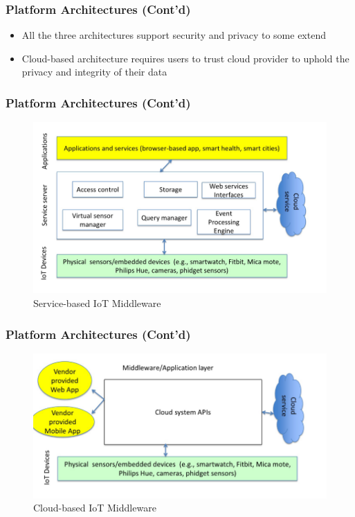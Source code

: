 \documentclass{../iot-lecture}
\begin{document}
\begin{frame}
  \frametitle{Platform Architectures (Cont'd)}
  \begin{itemize}
    \item All the three architectures support security and privacy to some extend
    \item Cloud-based architecture requires users to trust cloud provider to uphold the privacy
      and integrity of their data
  \end{itemize}
\end{frame}

\begin{frame}
  \frametitle{Platform Architectures (Cont'd)}
  \begin{figure}
    \includegraphics[width=\textwidth]{./img/service-based-iot-middleware.png}
    \caption{Service-based IoT Middleware}
  \end{figure}
\end{frame}

\begin{frame}
  \frametitle{Platform Architectures (Cont'd)}
  \begin{figure}
    \includegraphics[width=\textwidth]{./img/cloud-based-iot-middleware.png}
    \caption{Cloud-based IoT Middleware}
  \end{figure}
\end{frame}
\end{document}
